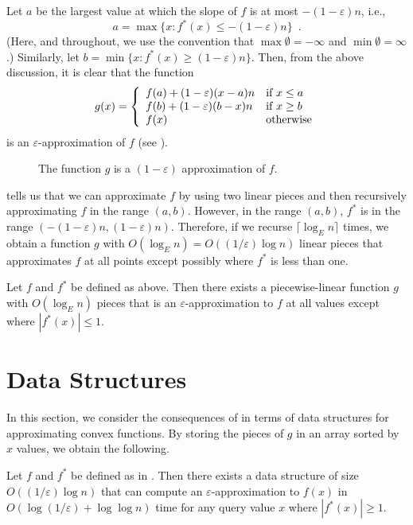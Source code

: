 \documentclass[charterfonts,lotsofwhite]{patmorin}
\newcommand{\eps}{\varepsilon}
\begin{document}
Let $a$ be the largest value at which the slope of $f$ is at most
$-(1-\eps)n$, i.e., 
\[
a=\max\{x:f^*(x)\le -(1-\eps)n \} \enspace .
\]
(Here, and throughout, we use the convention that
$\max\emptyset=-\infty$ and $\min\emptyset=\infty$.)  Similarly, let
$b=\min\{x:f^*(x)\ge (1-\eps) n\}$.  Then, from the above discussion,
it is clear that the function
\begin{equation}
 g(x) = \left\{\begin{array}{ll}
                 f(a) + (1-\eps)(x-a)n & \mbox{if $x\le a$} \\
                 f(b) + (1-\eps)(b-x)n & \mbox{if $x\ge b$} \\
                 f(x)   & \mbox{otherwise} \eqlabel{approx}
 \end{array}\right.
\end{equation}
is an $\eps$-approximation of $f$ (see ).

\begin{figure}
\caption{The function $g$ is a $(1-\eps)$ approximation of
$f$.}
\end{figure}

 tells us that we can approximate $f$ by using two
linear pieces and then recursively approximating $f$ in the range
$(a,b)$.  However, in the range $(a,b)$, $f^*$ is in the range
$(-(1-\eps)n, (1-\eps)n)$.  Therefore, if we recurse $\lceil \log_E
n\rceil$ times, we obtain a function $g$ with $O(\log_E n) =
O((1/\eps) \log n)$ linear pieces that approximates $f$ at all points
except possibly where $f^*$ is less than one.

\begin{thm}
Let $f$ and $f^*$ be defined as above.  Then there exists a piecewise-linear
function $g$ with $O(\log_E n)$ pieces that is an
$\eps$-approximation to $f$ at all values except where $|f^*(x)|\le 1$.
\end{thm}

\section{Data Structures}

In this section, we consider the consequences of  in
terms of data structures for approximating convex functions.  By
storing the pieces of $g$ in an array sorted by $x$ values, we obtain
the following.

\begin{thm}
Let $f$ and $f^*$ be defined as in .  Then there exists
a data structure of size $O((1/\eps) \log n)$ that can compute an
$\eps$-approximation to $f(x)$ in $O(\log (1/\eps) + \log \log n)$
time for any query value $x$ where $|f^*(x)|\ge 1$.
\end{thm}
\end{document}

